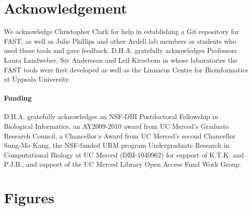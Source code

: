 \documentclass{frontiersSCNS} %
\begin{document}
\section*{Acknowledgement}
We acknowledge Christopher Clark for help in establishing a Git
repository for FAST, as well as Julie Phillips and other Ardell lab
members or students who used these tools and gave
feedback. D.H.A. gratefully acknowledges Professors Laura Landweber,
Siv Andersson and Leif Kirsebom in whose laboratories the FAST tools
were first developed as well as the Linnaeus Centre for Bioinformatics
at Uppsala University.

\paragraph{Funding\textcolon} D.H.A. gratefully acknowledges an
NSF-DBI Postdoctoral Fellowship in Biological Informatics, an
AY2009-2010 award from UC Merced's Graduate Research Council, a
Chancellor's Award from UC Merced's second Chancellor Sung-Mo Kang,
 the NSF-funded URM program Undergraduate Research in Computational
Biology at UC Merced (DBI-1040962) for support of K.T.K. and P.J.B.,
and support of the UC Merced Library Open Access Fund Work Group.



\section*{Figures}
\end{document}
